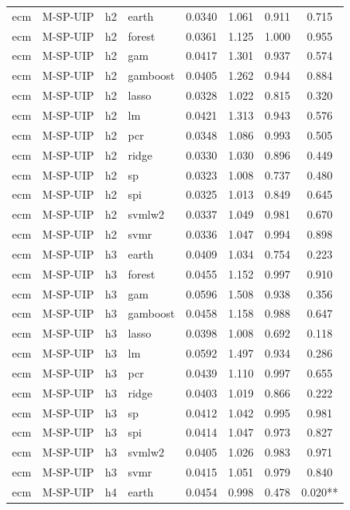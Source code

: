 \begin{ThreePartTable}
\begin{longtable}[t]{llclcccc}
\addlinespace
ecm & M-SP-UIP & h2 & earth & 0.0340 & 1.061 & 0.911 & 0.715\\
ecm & M-SP-UIP & h2 & forest & 0.0361 & 1.125 & 1.000 & 0.955\\
ecm & M-SP-UIP & h2 & gam & 0.0417 & 1.301 & 0.937 & 0.574\\
ecm & M-SP-UIP & h2 & gamboost & 0.0405 & 1.262 & 0.944 & 0.884\\
ecm & M-SP-UIP & h2 & lasso & 0.0328 & 1.022 & 0.815 & 0.320\\
ecm & M-SP-UIP & h2 & lm & 0.0421 & 1.313 & 0.943 & 0.576\\
ecm & M-SP-UIP & h2 & pcr & 0.0348 & 1.086 & 0.993 & 0.505\\
ecm & M-SP-UIP & h2 & ridge & 0.0330 & 1.030 & 0.896 & 0.449\\
ecm & M-SP-UIP & h2 & sp & 0.0323 & 1.008 & 0.737 & 0.480\\
ecm & M-SP-UIP & h2 & spi & 0.0325 & 1.013 & 0.849 & 0.645\\
ecm & M-SP-UIP & h2 & svmlw2 & 0.0337 & 1.049 & 0.981 & 0.670\\
ecm & M-SP-UIP & h2 & svmr & 0.0336 & 1.047 & 0.994 & 0.898\\
\addlinespace
ecm & M-SP-UIP & h3 & earth & 0.0409 & 1.034 & 0.754 & 0.223\\
ecm & M-SP-UIP & h3 & forest & 0.0455 & 1.152 & 0.997 & 0.910\\
ecm & M-SP-UIP & h3 & gam & 0.0596 & 1.508 & 0.938 & 0.356\\
ecm & M-SP-UIP & h3 & gamboost & 0.0458 & 1.158 & 0.988 & 0.647\\
ecm & M-SP-UIP & h3 & lasso & 0.0398 & 1.008 & 0.692 & 0.118\\
ecm & M-SP-UIP & h3 & lm & 0.0592 & 1.497 & 0.934 & 0.286\\
ecm & M-SP-UIP & h3 & pcr & 0.0439 & 1.110 & 0.997 & 0.655\\
ecm & M-SP-UIP & h3 & ridge & 0.0403 & 1.019 & 0.866 & 0.222\\
ecm & M-SP-UIP & h3 & sp & 0.0412 & 1.042 & 0.995 & 0.981\\
ecm & M-SP-UIP & h3 & spi & 0.0414 & 1.047 & 0.973 & 0.827\\
ecm & M-SP-UIP & h3 & svmlw2 & 0.0405 & 1.026 & 0.983 & 0.971\\
ecm & M-SP-UIP & h3 & svmr & 0.0415 & 1.051 & 0.979 & 0.840\\
\addlinespace
ecm & M-SP-UIP & h4 & earth & 0.0454 & 0.998 & 0.478 & 0.020**\\

\end{longtable}
\end{ThreePartTable}
